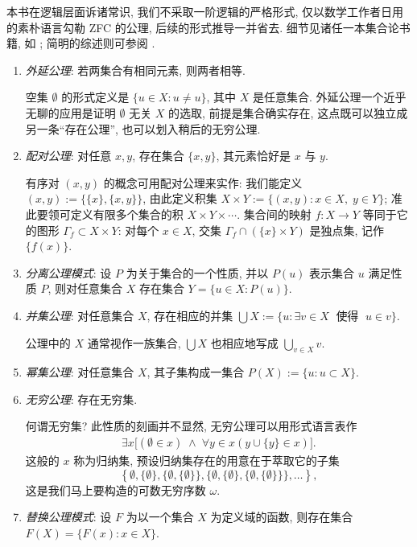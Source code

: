 本书在逻辑层面诉诸常识, 我们不采取一阶逻辑的严格形式, 仅以数学工作者日用的素朴语言勾勒 ZFC 的公理, 后续的形式推导一并省去. 细节见诸任一本集合论书籍, 如 \cite{Je03,HY14}; 简明的综述则可参阅 \cite{sep-set-theory}.
\begin{enumerate}[\bfseries {A}.1]
	\item \emph{外延公理}: 若两集合有相同元素, 则两者相等.

		空集 $\emptyset$ 的形式定义是 $\{u \in X: u \neq u\}$, 其中 $X$ 是任意集合. 外延公理一个近乎无聊的应用是证明 $\emptyset$ 无关 $X$ 的选取, 前提是集合确实存在, 这点既可以独立成另一条``存在公理'', 也可以划入稍后的无穷公理.
	\item \emph{配对公理}: 对任意 $x,y$, 存在集合 $\{x,y\}$, 其元素恰好是 $x$ 与 $y$.
	
		有序对 $(x,y)$ 的概念可用配对公理来实作: 我们能定义 $(x,y) := \{\{x\}, \{x,y\} \}$, 由此定义积集 $X \times Y := \{(x,y) : x \in X,\; y \in Y \}$; 准此要领可定义有限多个集合的积 $X \times Y \times \cdots$. 集合间的映射 $f: X \to Y$ 等同于它的图形 $\Gamma_f \subset X \times Y$: 对每个 $x \in X$, 交集 $\Gamma_f \cap (\{x\} \times Y)$ 是独点集, 记作 $\{f(x)\}$.
	\item \emph{分离公理模式}: 设 $P$ 为关于集合的一个性质, 并以 $P(u)$ 表示集合 $u$ 满足性质 $P$, 则对任意集合 $X$ 存在集合 $Y = \{u \in X : P(u) \}$.
	\item \emph{并集公理}:  对任意集合 $X$, 存在相应的并集 $\bigcup X := \{u : \exists v \in X \; \text{ 使得 }\; u \in v\}$.
	
		公理中的 $X$ 通常视作一族集合, $\bigcup X$ 也相应地写成 $\bigcup_{v \in X} v$.
	\item \emph{幂集公理}: 对任意集合 $X$, 其子集构成一集合 $P(X) := \{u : u \subset X \}$.
	\item \emph{无穷公理}: 存在无穷集.

		何谓无穷集? 此性质的刻画并不显然, 无穷公理可以用形式语言表作
		\begin{gather}\label{eqn:infinity-axiom}
			\exists x \bigl[ (\emptyset \in x) \;\wedge \;\forall y \in x \left(y \cup \{y\} \in x \right)  \bigr].
		\end{gather}
		这般的 $x$ 称为归纳集, 预设归纳集存在的用意在于萃取它的子集
		\[ \left\{\emptyset, \{\emptyset\}, \{  \emptyset, \{\emptyset\}\}, \{  \emptyset, \{\emptyset\}, \{  \emptyset, \{\emptyset\}\}\}, \ldots \right\}, \]
		这是我们马上要构造的可数无穷序数 $\omega$.
	\item \emph{替换公理模式}: 设 $F$ 为以一个集合 $X$ 为定义域的函数, 则存在集合 $F(X) = \{ F(x) : x \in X\}$.
	

\end{enumerate}
